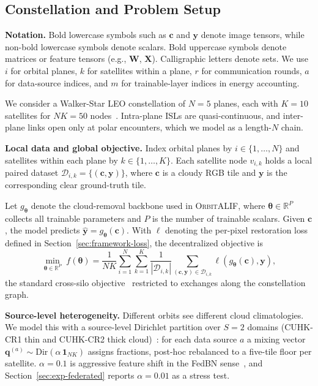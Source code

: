 \documentclass[conference]{IEEEtran}
\newcommand{\Dir}{\mathrm{Dir}}
\newcommand{\OrbitALIF}{\textsc{OrbitALIF}}
\begin{document}
\subsection{Constellation and Problem Setup}\label{sec:sysmodel-setup}

\textbf{Notation.} Bold lowercase symbols such as $\mathbf{c}$ and
$\mathbf{y}$ denote image tensors, while non-bold lowercase symbols
denote scalars. Bold uppercase symbols denote matrices or feature
tensors (e.g., $\mathbf{W}$, $\mathbf{X}$). Calligraphic letters
denote sets. We use $i$ for orbital planes, $k$ for satellites
within a plane, $r$ for communication rounds, $a$ for data-source
indices, and $m$ for trainable-layer indices in energy accounting.

We consider a Walker-Star LEO constellation of $N\!=\!5$ planes,
each with $K\!=\!10$ satellites for $NK\!=\!50$
nodes~\cite{ref:walker1984,ref:flsnn}. Intra-plane ISLs are
quasi-continuous, and inter-plane links open only at polar
encounters, which we model as a length-$N$ chain.

\textbf{Local data and global objective.} Index orbital planes by
$i\!\in\!\{1,\dots,N\}$ and satellites within each plane by
$k\!\in\!\{1,\dots,K\}$. Each satellite node $v_{i,k}$ holds a local
paired dataset
$\mathcal{D}_{i,k}=\{(\mathbf{c},\mathbf{y})\}$, where
$\mathbf{c}$ is a cloudy RGB tile and $\mathbf{y}$ is the
corresponding clear ground-truth tile.

Let $g_{\boldsymbol{\theta}}$ denote the cloud-removal backbone used
in \OrbitALIF{}, where $\boldsymbol{\theta}\!\in\!\mathbb{R}^{P}$
collects all trainable parameters and $P$ is the number of trainable
scalars. Given $\mathbf{c}$, the model predicts
$\hat{\mathbf{y}}=g_{\boldsymbol{\theta}}(\mathbf{c})$.
With $\ell$ denoting the per-pixel restoration loss defined in
Section~\ref{sec:framework-loss}, the decentralized objective is
\begin{equation}
\min_{\boldsymbol{\theta}\in\mathbb{R}^{P}}\;
f(\boldsymbol{\theta})
=
\frac{1}{NK}
\sum_{i=1}^{N}
\sum_{k=1}^{K}
\frac{1}{|\mathcal{D}_{i,k}|}
\sum_{(\mathbf{c},\mathbf{y})\in\mathcal{D}_{i,k}}
\ell\!\left(g_{\boldsymbol{\theta}}(\mathbf{c}),\mathbf{y}\right),
\label{eq:globalobj}
\end{equation}
the standard cross-silo objective~\cite{ref:fedavg} restricted to
exchanges along the constellation graph.

\textbf{Source-level heterogeneity.} Different orbits see different
cloud climatologies. We model this with a source-level Dirichlet
partition over $S\!=\!2$ domains (CUHK-CR1 thin and CUHK-CR2 thick
cloud)~\cite{ref:hsu2019}: for each data source $a$ a mixing vector
$\mathbf{q}^{(a)}\!\sim\!\Dir(\alpha\,\mathbf{1}_{NK})$ assigns
fractions, post-hoc rebalanced to a five-tile floor per satellite.
$\alpha\!=\!0.1$ is aggressive feature shift in the FedBN
sense~\cite{ref:fedbn}, and Section~\ref{sec:exp-federated}
reports $\alpha\!=\!0.01$ as a stress test.
\end{document}
